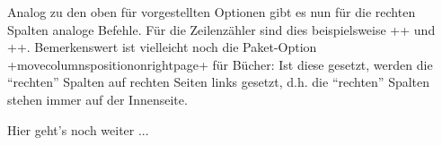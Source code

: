 Analog zu den oben für \reledmac vorgestellten Optionen gibt es nun für die rechten Spalten analoge Befehle. Für die Zeilenzähler sind dies beispielsweise ++ und ++. Bemerkenswert ist vielleicht noch die Paket-Option +movecolumnspositiononrightpage+ für Bücher: Ist diese gesetzt, werden die \enquote{rechten} Spalten auf rechten Seiten links gesetzt, d.h. die \enquote{rechten} Spalten stehen immer auf der Innenseite.

Hier geht's noch weiter ...
%

%
%
\UndefineShortVerb{\+}

